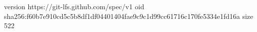 version https://git-lfs.github.com/spec/v1
oid sha256:f60b7e910cd5c5b8df1df04401404fae9c9c1d99cc61716c170fe5334e1fd16a
size 522
